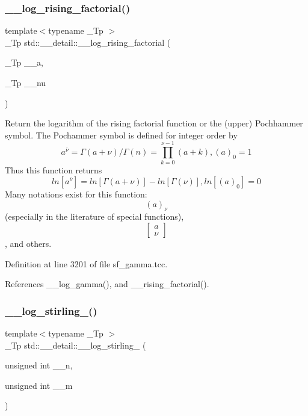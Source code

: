 \subsubsection{\texorpdfstring{\+\_\+\+\_\+log\+\_\+rising\+\_\+factorial()}{\_\_log\_rising\_factorial()}}
{\footnotesize\ttfamily template$<$typename \+\_\+\+Tp $>$ \\
\+\_\+\+Tp std\+::\+\_\+\+\_\+detail\+::\+\_\+\+\_\+log\+\_\+rising\+\_\+factorial (\begin{DoxyParamCaption}\item[{\+\_\+\+Tp}]{\+\_\+\+\_\+a,  }\item[{\+\_\+\+Tp}]{\+\_\+\+\_\+nu }\end{DoxyParamCaption})}



Return the logarithm of the rising factorial function or the (upper) Pochhammer symbol. The Pochammer symbol is defined for integer order by \[ a^{\overline{\nu}} = \Gamma(a + \nu) / \Gamma(n) = \prod_{k=0}^{\nu-1} (a + k), (a)_0 = 1 \] Thus this function returns \[ ln[a^{\overline{\nu}}] = ln[\Gamma(a + \nu)] - ln[\Gamma(\nu)], ln[(a)_0] = 0 \] Many notations exist for this function\+: \[ (a)_\nu \] (especially in the literature of special functions), \[ \left[ \begin{array}{c} a \\ \nu \end{array} \right] \], and others. 



Definition at line 3201 of file sf\+\_\+gamma.\+tcc.



References \+\_\+\+\_\+log\+\_\+gamma(), and \+\_\+\+\_\+rising\+\_\+factorial().

\mbox{\label{namespacestd_1_1____detail_a4924c5c0666c33328d6276b5dbbdfad5}} 
\subsubsection{\texorpdfstring{\+\_\+\+\_\+log\+\_\+stirling\+\_()}{\_\_log\_stirling\_1()}}
{\footnotesize\ttfamily template$<$typename \+\_\+\+Tp $>$ \\
\+\_\+\+Tp std\+::\+\_\+\+\_\+detail\+::\+\_\+\+\_\+log\+\_\+stirling\+\_ (\begin{DoxyParamCaption}\item[{unsigned int}]{\+\_\+\+\_\+n,  }\item[{unsigned int}]{\+\_\+\+\_\+m }\end{DoxyParamCaption})}

